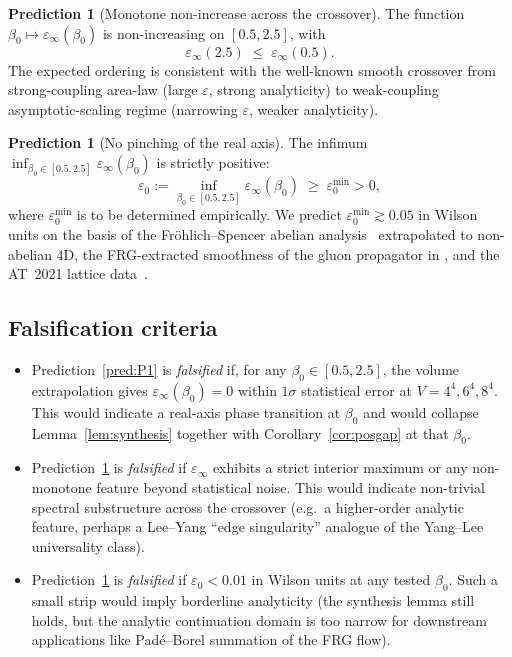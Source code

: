 \documentclass[11pt,a4paper]{article}
\theoremstyle{definition}
\newtheorem{prediction}[theorem]{Prediction}
\theoremstyle{remark}
\begin{document}
\begin{prediction}[Monotone non-increase across the crossover]
\label{pred:P2}
The function $\beta_0 \mapsto \varepsilon_\infty(\beta_0)$ is
non-increasing on $[0.5, 2.5]$, with
\begin{equation}
\varepsilon_\infty(2.5) \;\le\;
\varepsilon_\infty(0.5).
\label{eq:P2}
\end{equation}
The expected ordering is consistent with the well-known smooth
crossover from strong-coupling area-law (large $\varepsilon$,
strong analyticity) to weak-coupling asymptotic-scaling regime
(narrowing $\varepsilon$, weaker analyticity).
\end{prediction}

\begin{prediction}[No pinching of the real axis]\label{pred:P3}
The infimum $\inf_{\beta_0 \in [0.5, 2.5]}
\varepsilon_\infty(\beta_0)$ is strictly positive:
\begin{equation}
\varepsilon_0 := \inf_{\beta_0 \in [0.5, 2.5]}
\varepsilon_\infty(\beta_0) \;\ge\; \varepsilon_0^{\min} > 0,
\label{eq:P3}
\end{equation}
where $\varepsilon_0^{\min}$ is to be determined empirically. We
predict $\varepsilon_0^{\min} \gtrsim 0.05$ in Wilson units on
the basis of the Fr\"ohlich--Spencer abelian
analysis~\cite{FroehlichSpencer1982} extrapolated to non-abelian
4D, the FRG-extracted smoothness of the gluon propagator in
\cite{Cyrol2016}, and the AT~2021 lattice
data~\cite{AthenodorouTeper2021}.
\end{prediction}

\subsection{Falsification criteria}

\begin{itemize}
\item Prediction~\ref{pred:P1} is \emph{falsified} if, for any
$\beta_0 \in [0.5, 2.5]$, the volume extrapolation gives
$\varepsilon_\infty(\beta_0) = 0$ within $1\sigma$ statistical
error at $V = 4^4, 6^4, 8^4$. This would indicate a real-axis
phase transition at $\beta_0$ and would collapse
Lemma~\ref{lem:synthesis} together with
Corollary~\ref{cor:posgap} at that $\beta_0$.

\item Prediction~\ref{pred:P2} is \emph{falsified} if
$\varepsilon_\infty$ exhibits a strict interior maximum or any
non-monotone feature beyond statistical noise. This would
indicate non-trivial spectral substructure across the crossover
(e.g.\ a higher-order analytic feature, perhaps a Lee--Yang
``edge singularity'' analogue of the Yang--Lee universality class).

\item Prediction~\ref{pred:P3} is \emph{falsified} if
$\varepsilon_0 < 0.01$ in Wilson units at any tested $\beta_0$.
Such a small strip would imply borderline analyticity (the
synthesis lemma still holds, but the analytic continuation
domain is too narrow for downstream applications like
Pad\'e--Borel summation of the FRG flow).
\end{itemize}
\end{document}
